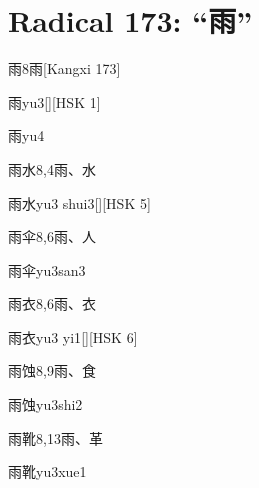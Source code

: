 
\section*{Radical 173: ``⾬''}

\begin{Entry}{雨}{8}{⾬}[Kangxi 173]
  \begin{Phonetics}{雨}{yu3}[][HSK 1]
  \end{Phonetics}
  \begin{Phonetics}{雨}{yu4}
  \end{Phonetics}
\end{Entry}

\begin{Entry}{雨水}{8,4}{⾬、⽔}
  \begin{Phonetics}{雨水}{yu3 shui3}[][HSK 5]
  \end{Phonetics}
\end{Entry}

\begin{Entry}{雨伞}{8,6}{⾬、⼈}
  \begin{Phonetics}{雨伞}{yu3san3}
  \end{Phonetics}
\end{Entry}

\begin{Entry}{雨衣}{8,6}{⾬、⾐}
  \begin{Phonetics}{雨衣}{yu3 yi1}[][HSK 6]
  \end{Phonetics}
\end{Entry}

\begin{Entry}{雨蚀}{8,9}{⾬、⾷}
  \begin{Phonetics}{雨蚀}{yu3shi2}
  \end{Phonetics}
\end{Entry}

\begin{Entry}{雨靴}{8,13}{⾬、⾰}
  \begin{Phonetics}{雨靴}{yu3xue1}
  \end{Phonetics}
\end{Entry}

